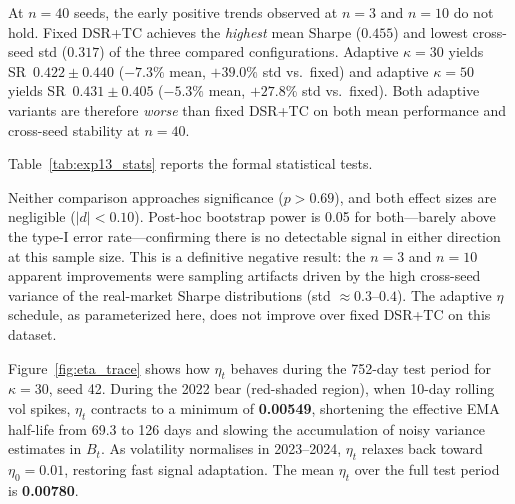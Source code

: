 \documentclass[conference]{IEEEtran}
\begin{document}
At $n=40$ seeds, the early positive trends observed at $n=3$ and $n=10$
do not hold. Fixed DSR+TC achieves the \emph{highest} mean Sharpe
($\mathbf{0.455}$) and lowest cross-seed std ($\mathbf{0.317}$)
of the three compared configurations.
Adaptive $\kappa=30$ yields SR~$0.422 \pm 0.440$ ($-7.3\%$ mean,
$+39.0\%$ std vs.\ fixed) and adaptive $\kappa=50$ yields
SR~$0.431 \pm 0.405$ ($-5.3\%$ mean, $+27.8\%$ std vs.\ fixed).
Both adaptive variants are therefore \emph{worse} than fixed DSR+TC
on both mean performance and cross-seed stability at $n=40$.

Table~\ref{tab:exp13_stats} reports the formal statistical tests.

\begin{table}[t]
\caption{Statistical Tests: Adaptive vs.\ Fixed DSR+TC ($n=40$ each)}
\label{tab:exp13_stats}
\centering
{}
\end{table}

Neither comparison approaches significance ($p > 0.69$), and both
effect sizes are negligible ($|d| < 0.10$). Post-hoc bootstrap power
is 0.05 for both---barely above the type-I error rate---confirming
there is no detectable signal in either direction at this sample size.
This is a definitive negative result: the $n=3$ and $n=10$ apparent
improvements were sampling artifacts driven by the high cross-seed
variance of the real-market Sharpe distributions (std $\approx 0.3$--$0.4$).
The adaptive $\eta$ schedule, as parameterized here, does not
improve over fixed DSR+TC on this dataset.

Figure~\ref{fig:eta_trace} shows how $\eta_t$ behaves during the
752-day test period for $\kappa=30$, seed 42. During the 2022 bear
(red-shaded region), when 10-day rolling vol spikes, $\eta_t$ contracts
to a minimum of \textbf{0.00549}, shortening the effective EMA half-life
from 69.3 to 126 days and slowing the accumulation of noisy variance
estimates in $B_t$. As volatility normalises in 2023--2024, $\eta_t$
relaxes back toward $\eta_0=0.01$, restoring fast signal adaptation.
The mean $\eta_t$ over the full test period is \textbf{0.00780}.
\end{document}
